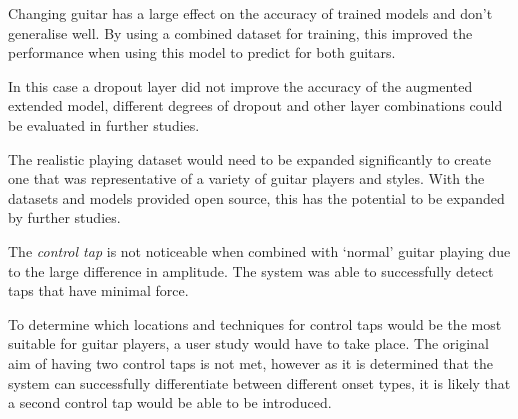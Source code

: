 \documentclass[conference]{IEEEtran}
\begin{document}
Changing guitar has a large effect on the accuracy of trained models and don't generalise well. By using a combined dataset for training, this improved the performance when using this model to predict for both guitars. 

In this case a dropout layer did not improve the accuracy of the augmented extended model, different degrees of dropout and other layer combinations could be evaluated in further studies. 

The realistic playing dataset would need to be expanded significantly to create one that was representative of a variety of guitar players and styles. With the datasets and models provided open source, this has the potential to be expanded by further studies.

The \emph{control tap} is not noticeable when combined with `normal' guitar playing due to the large difference in amplitude. The system was able to successfully detect taps that have minimal force.

To determine which locations and techniques for control taps would be the most suitable for guitar players, a user study would have to take place. The original aim of having two control taps is not met, however as it is determined
that the system can successfully differentiate between different onset types, it is likely that a second control tap would be able to be introduced.
\end{document}
